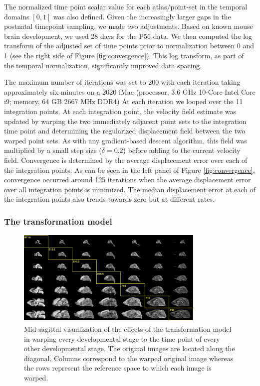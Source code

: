 \documentclass[
  12pt,
]{article}
\begin{document}
The normalized time point scalar value for each atlas/point-set in the
temporal domains \([0, 1]\) was also defined. Given the increasingly
larger gaps in the postnatal timepoint sampling, we made two
adjustments. Based on known mouse brain development, we used 28 days for
the P56 data. We then computed the log transform of the adjusted set of
time points prior to normalization between 0 and 1 (see the right side
of Figure \ref{fig:convergence}). This log transform, as part of the
temporal normalization, significantly improved data spacing.

The maximum number of iterations was set to 200 with each iteration
taking approximately six minutes on a 2020 iMac (processor, 3.6 GHz
10-Core Intel Core i9; memory, 64 GB 2667 MHz DDR4) At each iteration we
looped over the 11 integration points. At each integration point, the
velocity field estimate was updated by warping the two immediately
adjacent point sets to the integration time point and determining the
regularized displacement field between the two warped point sets. As
with any gradient-based descent algorithm, this field was multiplied by
a small step size (\(\delta = 0.2\)) before adding to the current
velocity field. Convergence is determined by the average displacement
error over each of the integration points. As can be seen in the left
panel of Figure \ref{fig:convergence}, convergence occurred around 125
iterations when the average displacement error over all integration
points is minimized. The median displacement error at each of the
integration points also trends towards zero but at different rates.

\hypertarget{the-transformation-model}{%
\subsubsection{The transformation
model}\label{the-transformation-model}}

\begin{figure}[!htb]
\centering
\includegraphics[width=0.8\textwidth]{Figures/CrossWarp.pdf}
\caption{Mid-sagittal visualization of the effects of the transformation model in
warping every developmental stage to the time point of every other developmental
stage.  The original images are located along the diagonal.  Columns correspond
to the warped original image whereas the rows represent the reference space to which
each image is warped.}
\label{fig:crosswarp}
\end{figure}
\end{document}
